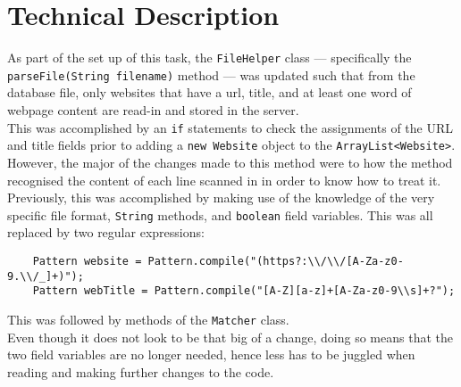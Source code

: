 \section{Technical Description}
As part of the set up of this task, the {\tt FileHelper} class — specifically the {\tt parseFile(String filename)} method — was updated such that from the database file, only websites that have a url, title, and at least one word of webpage content are read-in and stored in the server.\\
This was accomplished by an {\tt if} statements to check the assignments of the URL and title fields prior to adding a {\tt new Website} object to the {\tt ArrayList<Website>}. However, the major of the changes made to this method were to how the method recognised the content of each line scanned in in order to know how to treat it.\\
Previously, this was accomplished by making use of the knowledge of the very specific file format, {\tt String} methods, and {\tt boolean} field variables. This was all replaced by two regular expressions:
\begin{lstlisting}
    Pattern website = Pattern.compile("(https?:\\/\\/[A-Za-z0-9.\\/_]+)");
    Pattern webTitle = Pattern.compile("[A-Z][a-z]+[A-Za-z0-9\\s]+?");
\end{lstlisting}
This was followed by methods of the {\tt Matcher} class.\\
Even though it does not look to be that big of a change, doing so means that the two field variables are no longer needed, hence less has to be juggled when reading and making further changes to the code.

